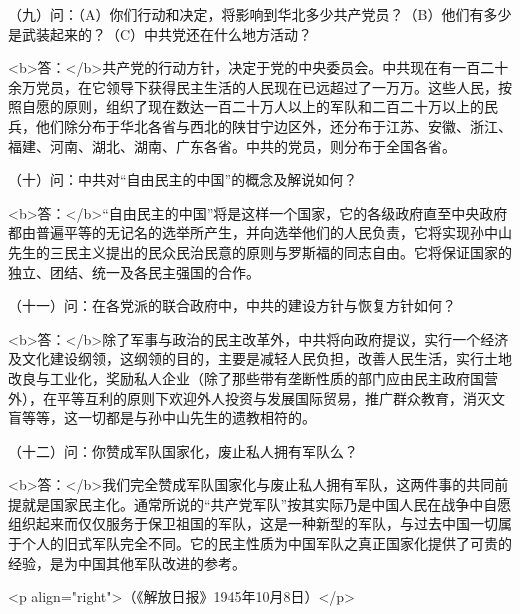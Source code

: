 （九）问：（A）你们行动和决定，将影响到华北多少共产党员？（B）他们有多少是武装起来的？（C）中共党还在什么地方活动？

<b>答：</b>共产党的行动方针，决定于党的中央委员会。中共现在有一百二十余万党员，在它领导下获得民主生活的人民现在已远超过了一万万。这些人民，按照自愿的原则，组织了现在数达一百二十万人以上的军队和二百二十万以上的民兵，他们除分布于华北各省与西北的陕甘宁边区外，还分布于江苏、安徽、浙江、福建、河南、湖北、湖南、广东各省。中共的党员，则分布于全国各省。

（十）问：中共对“自由民主的中国”的概念及解说如何？

<b>答：</b>“自由民主的中国”将是这样一个国家，它的各级政府直至中央政府都由普遍平等的无记名的选举所产生，并向选举他们的人民负责，它将实现孙中山先生的三民主义提出的民众民治民意的原则与罗斯福的同志自由。它将保证国家的独立、团结、统一及各民主强国的合作。

（十一）问：在各党派的联合政府中，中共的建设方针与恢复方针如何？

<b>答：</b>除了军事与政治的民主改革外，中共将向政府提议，实行一个经济及文化建设纲领，这纲领的目的，主要是减轻人民负担，改善人民生活，实行土地改良与工业化，奖励私人企业（除了那些带有垄断性质的部门应由民主政府国营外），在平等互利的原则下欢迎外人投资与发展国际贸易，推广群众教育，消灭文盲等等，这一切都是与孙中山先生的遗教相符的。

（十二）问：你赞成军队国家化，废止私人拥有军队么？

<b>答：</b>我们完全赞成军队国家化与废止私人拥有军队，这两件事的共同前提就是国家民主化。通常所说的“共产党军队”按其实际乃是中国人民在战争中自愿组织起来而仅仅服务于保卫祖国的军队，这是一种新型的军队，与过去中国一切属于个人的旧式军队完全不同。它的民主性质为中国军队之真正国家化提供了可贵的经验，是为中国其他军队改进的参考。

<p align="right">（《解放日报》1945年10月8日）</p>

